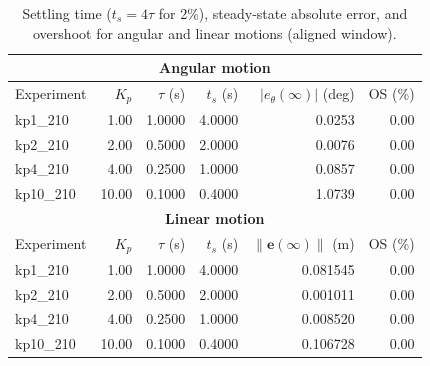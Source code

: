 \begin{table}[!t]
\centering
\caption{Settling time ($t_s=4\tau$ for 2\%), steady-state absolute error, and overshoot for angular and linear motions (aligned window).}
\label{tab:metrics_motion}
\setlength{\tabcolsep}{6pt}
\renewcommand{\arraystretch}{1.15}
\begin{tabular}{lrrrrr}
\toprule
\multicolumn{6}{c}{\textbf{Angular motion}}\\
\midrule
Experiment & $K_p$ & $\tau$ (s) & $t_s$ (s) & $|e_\theta(\infty)|$ (deg) & OS (\%)\\
\midrule
kp1_210 & 1.00 & 1.0000 & 4.0000 & 0.0253 & 0.00\\
kp2_210 & 2.00 & 0.5000 & 2.0000 & 0.0076 & 0.00\\
kp4_210 & 4.00 & 0.2500 & 1.0000 & 0.0857 & 0.00\\
kp10_210 & 10.00 & 0.1000 & 0.4000 & 1.0739 & 0.00\\
\midrule
\multicolumn{6}{c}{\textbf{Linear motion}}\\
\midrule
Experiment & $K_p$ & $\tau$ (s) & $t_s$ (s) & $\|\mathbf{e}(\infty)\|$ (m) & OS (\%)\\
\midrule
kp1_210 & 1.00 & 1.0000 & 4.0000 & 0.081545 & 0.00\\
kp2_210 & 2.00 & 0.5000 & 2.0000 & 0.001011 & 0.00\\
kp4_210 & 4.00 & 0.2500 & 1.0000 & 0.008520 & 0.00\\
kp10_210 & 10.00 & 0.1000 & 0.4000 & 0.106728 & 0.00\\
\bottomrule
\end{tabular}
\end{table}

